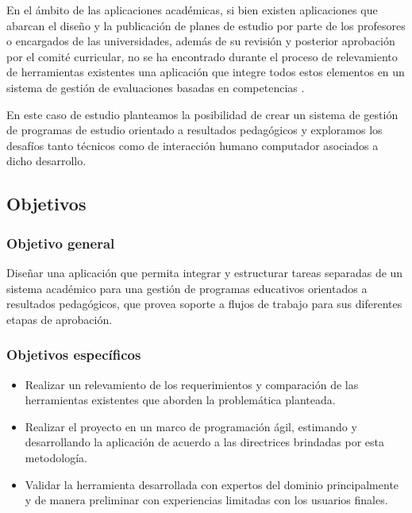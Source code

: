 En el ámbito de las aplicaciones académicas, si bien existen aplicaciones que abarcan el diseño y la publicación de planes de estudio por parte de los profesores o encargados de las universidades, además de su revisión y posterior aprobación por el comité curricular, no se ha encontrado durante el proceso de relevamiento de herramientas existentes una aplicación que integre todos estos elementos en un sistema de gestión de evaluaciones basadas en competencias \citep{curricunet_webpage}\citep{courseleaf_webpage}\citep{deca_webpage}.
 
En este caso de estudio \citep{runeson2012case} planteamos la posibilidad de crear un sistema de gestión de programas de estudio orientado a resultados pedagógicos y exploramos los desafíos tanto técnicos como de interacción humano computador asociados a dicho desarrollo.

\subsection{Objetivos}
\subsubsection{Objetivo general}
Diseñar una aplicación que permita integrar y estructurar tareas separadas de un sistema académico para una gestión de programas educativos orientados a resultados pedagógicos, que provea soporte a flujos de trabajo para sus diferentes etapas de aprobación.

\subsubsection{Objetivos específicos}
  \begin{itemize}
    \item Realizar un relevamiento de los requerimientos y comparación de las herramientas existentes que aborden la problemática planteada.
    \item Realizar el proyecto en un marco de programación ágil, estimando y desarrollando la aplicación de acuerdo a las directrices brindadas por esta metodología.
    \item Validar la herramienta desarrollada con expertos del dominio principalmente y de manera preliminar con experiencias limitadas con los usuarios finales.
  \end{itemize}
